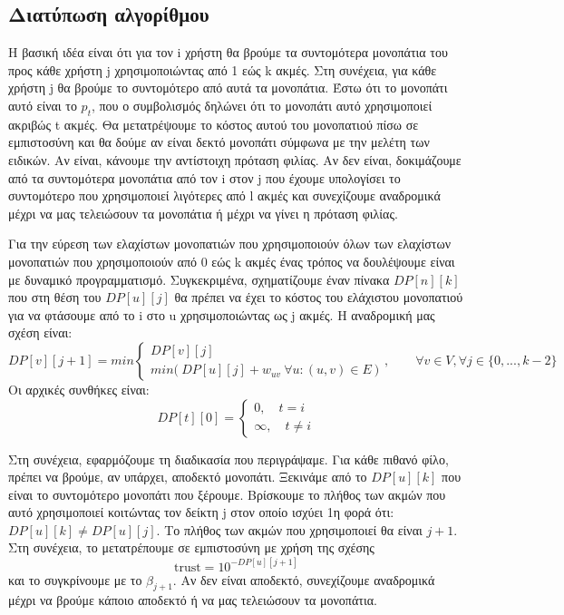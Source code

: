 \documentclass[a4paper,oneside, 11pt]{article}
\begin{document}
\subsection{Διατύπωση αλγορίθμου}
Η βασική ιδέα είναι ότι για τον i χρήστη θα βρούμε τα συντομότερα μονοπάτια του προς κάθε χρήστη j χρησιμοποιώντας από 1 εώς k ακμές. Στη συνέχεια, για κάθε χρήστη j θα βρούμε το συντομότερο από αυτά τα μονοπάτια. Έστω ότι το μονοπάτι αυτό είναι το $p_t$, που ο συμβολισμός δηλώνει ότι το μονοπάτι αυτό χρησιμοποιεί ακριβώς t ακμές. Θα μετατρέψουμε το κόστος αυτού του μονοπατιού πίσω σε εμπιστοσύνη και θα δούμε αν είναι δεκτό μονοπάτι σύμφωνα με την μελέτη των ειδικών. Αν είναι, κάνουμε την αντίστοιχη πρόταση φιλίας. Αν δεν είναι, δοκιμάζουμε από τα συντομότερα μονοπάτια από τον i στον j που έχουμε υπολογίσει το συντομότερο που χρησιμοποιεί λιγότερες από l ακμές και συνεχίζουμε αναδρομικά μέχρι να μας τελειώσουν τα μονοπάτια ή μέχρι να γίνει η πρόταση φιλίας. \bigbreak 

Για την εύρεση των ελαχίστων μονοπατιών που χρησιμοποιούν όλων των ελαχίστων μονοπατιών που χρησιμοποιούν από 0 εώς k ακμές ένας τρόπος να δουλέψουμε είναι με δυναμικό προγραμματισμό. Συγκεκριμένα, σχηματίζουμε έναν πίνακα $DP[n][k]$ που στη θέση του $DP[u][j]$ θα πρέπει να έχει το κόστος του ελάχιστου μονοπατιού για να φτάσουμε από το i στο u χρησιμοποιώντας ως j ακμές. 
\bigbreak 
Η αναδρομική μας σχέση είναι:
$$
DP[v][j+1] = min \begin{cases}
DP[v][j] \\ min \big( \ DP[u][j] + w_{uv}  \  \forall u: (u, v) \in E \  \big) 
\end{cases}, \qquad \forall v \in V, \forall j \in \{0, ..., k-2\}
$$
Οι αρχικές συνθήκες είναι: $$DP[t][0] = \begin{cases}
0, \quad t = i \\
\infty, \quad t \neq i
\end{cases}$$

\bigbreak 

Στη συνέχεια, εφαρμόζουμε τη διαδικασία που περιγράψαμε. Για κάθε πιθανό φίλο, πρέπει να βρούμε, αν υπάρχει, αποδεκτό μονοπάτι. Ξεκινάμε από το $DP[u][k]$ που είναι το συντομότερο μονοπάτι που ξέρουμε. Βρίσκουμε το πλήθος των ακμών που αυτό χρησιμοποιεί κοιτώντας τον δείκτη j στον οποίο ισχύει 1η φορά ότι: $DP[u][k]\neq DP[u][j]$. Το πλήθος των ακμών που χρησιμοποιεί θα είναι $j+1$. Στη συνέχεια, το μετατρέπουμε σε εμπιστοσύνη με χρήση της σχέσης $$\textrm{trust} = 10^{-DP[u][j+1]}$$ και το συγκρίνουμε με το $\beta_{j+1}$. Αν δεν είναι αποδεκτό, συνεχίζουμε αναδρομικά μέχρι να βρούμε κάποιο αποδεκτό ή να μας τελειώσουν τα μονοπάτια.
\end{document}
